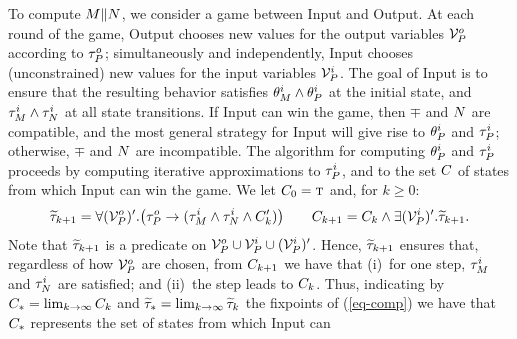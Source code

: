 \noindent 
To compute $M \| N$, we consider a game between Input and Output. 
At each round of the game, Output chooses new values for the
output variables ${\cal V}^o_P$ according to 
$\tau^o_P$; 
simultaneously and independently, Input chooses (unconstrained) new
values for the input variables ${\cal V}^i_P$.
The goal of Input is to ensure that the resulting behavior satisfies
$\theta^i_M \wedge \theta^i_P$ at the initial state, and 
$\tau^i_M \wedge \tau^i_N$ at all state transitions.
If Input can win the game, then $\mp$ and $N$ are
compatible, and the most general strategy for Input will give
rise to $\theta^i_P$ and $\tau^i_P$; 
otherwise, $\mp$ and $N$ are incompatible. 
%
%
The algorithm for computing $\theta^i_P$ and $\tau^i_P$ proceeds by
computing iterative approximations to $\tau^i_P$, and to the set
$C$ of states from which Input can win the game. 
We let $C_0 = \mbox{\sc t}$ and, for $k \geq 0$: 
%
\begin{equation} 
  \label{eq-comp}
  \htau_{k+1} = \forall (\ovars_\mr)' . 
		\bigl(\otrans_\mr \im (\itrans_\mp \und \itrans_\mq \und \ctrl'_k)\bigr)
  \eqspa 
  \ctrl_{k+1} = \ctrl_k \und \exists (\ivars_\mr)' . \htau_{k+1} . 
\end{equation}
%
Note that $\widetilde{\tau}_{k+1}$ is a predicate on ${\cal V}^o_P \cup
{\cal V}^i_P \cup ({\cal V}^i_P)'$. 
Hence, $\widetilde{\tau}_{k+1}$ ensures that, regardless of how ${\cal V}^o_P$ are
chosen, from $C_{k+1}$ we have that 
(i)~for one step, $\tau^i_M$ and $\tau^i_N$ are satisfied; 
and (ii)~the step leads to $C_k$. 
Thus, indicating by $C_* = \lim_{k \rightarrow \infty} C_k$ 
and $\widetilde{\tau}_* = \lim_{k \rightarrow \infty} \widetilde{\tau}_k$ the fixpoints of
(\ref{eq-comp}) we have that 
$C_*$ represents the set of states from which Input can
